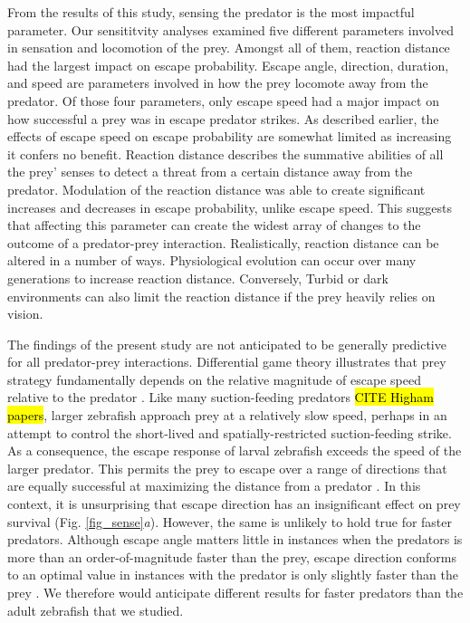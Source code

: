 \documentclass[]{rsos}%
\begin{document}
From the results of this study, sensing the predator is the most impactful parameter.
Our sensititvity analyses examined five different parameters involved in sensation and locomotion of the prey.
Amongst all of them, reaction distance had the largest impact on escape probability. 
Escape angle, direction, duration, and speed are parameters involved in how the prey locomote away from the predator.
Of those four parameters, only escape speed had a major impact on how successful a prey was in escape predator strikes.
As described earlier, the effects of escape speed on escape probability are somewhat limited as increasing it confers no benefit.
Reaction distance describes the summative abilities of all the prey' senses to detect a threat from a certain distance away from the predator.
Modulation of the reaction distance was able to create significant increases and decreases in escape probability, unlike escape speed.
This suggests that affecting this parameter can create the widest array of changes to the outcome of a predator-prey interaction.
Realistically, reaction distance can be altered in a number of ways. 
Physiological evolution can occur over many generations to increase reaction distance.
Conversely, Turbid or dark environments can also limit the reaction distance if the prey heavily relies on vision.

The findings of the present study are not anticipated to be generally predictive for all predator-prey interactions. 
Differential game theory illustrates that prey strategy fundamentally depends on the relative magnitude of escape speed relative to the predator \cite{Weihs:1984tb}.
Like many suction-feeding predators \hl{CITE Higham papers}, larger zebrafish approach prey at a relatively slow speed, perhaps in an attempt to control the short-lived and spatially-restricted suction-feeding strike. 
As a consequence, the escape response of larval zebrafish exceeds the speed of the larger predator. 
This permits the prey to escape over a range of directions that are equally successful at maximizing the distance from a predator \cite{Soto:2015cj}.
In this context, it is unsurprising that escape direction has an insignificant effect on prey survival (Fig. \ref{fig_sense}\textit{a}).
However, the same is unlikely to hold true for faster predators.  
Although escape angle matters little in instances when the predators is more than an order-of-magnitude faster than the prey, escape direction conforms to an optimal value in instances with the predator is only slightly faster than the prey \cite{Weihs:1984tb}.
We therefore would anticipate different results for faster predators than the adult zebrafish that we studied.
\end{document}

